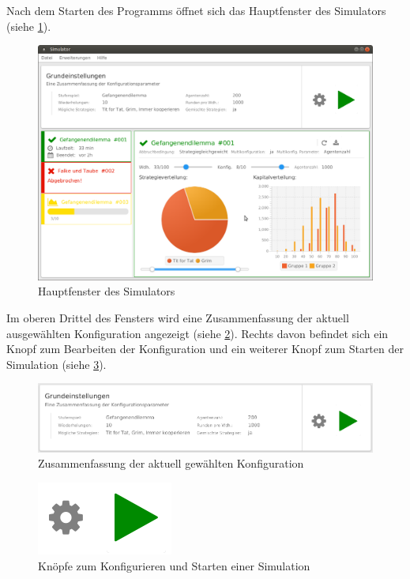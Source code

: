 \documentclass[parskip=full,11pt]{scrartcl}
\begin{document}
Nach dem Starten des Programms öffnet sich das Hauptfenster des Simulators \\(siehe \cref{fig:home}).

\begin{figure}[hb]
	\includegraphics[width=\textwidth]{images/home.png}
	\caption{\label{fig:home}
		Hauptfenster des Simulators}
\end{figure}

Im oberen Drittel des Fensters wird eine Zusammenfassung der aktuell ausgewählten Konfiguration angezeigt (siehe \cref{fig:home_top}). Rechts davon befindet sich ein Knopf zum Bearbeiten der Konfiguration und ein weiterer Knopf zum Starten der Simulation (siehe \cref{fig:main_btn}).
 
\begin{figure}[hb]
	\centering
	\includegraphics[width=\textwidth]{images/home_top.png}
	\caption{\label{fig:home_top}
	Zusammenfassung der aktuell gewählten Konfiguration}
\end{figure} 
 
\begin{figure}[ht]
	\centering
 	\includegraphics[width=0.25\linewidth]{images/main_btn.png}
 	\caption{\label{fig:main_btn}
 		Knöpfe zum Konfigurieren und Starten einer Simulation}
\end{figure}
\end{document}

